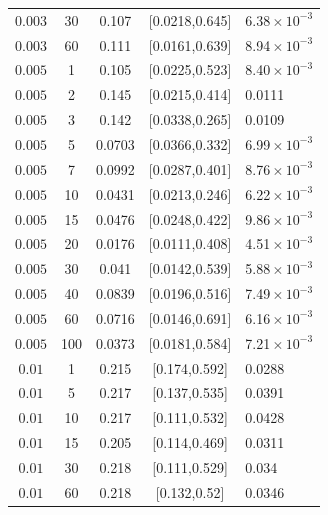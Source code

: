 \documentclass[11pt]{article}
\numberwithin{equation}{section}
\begin{document}
\begin{longtable}{ccccl}
$0.003$ & 30 & 0.107 & [0.0218,0.645] & 6.38$\!\times\!10^{-3}$ \\
$0.003$ & 60 & 0.111 & [0.0161,0.639] & 8.94$\!\times\!10^{-3}$ \\
$0.005$ & 1 & 0.105 & [0.0225,0.523] & 8.40$\!\times\!10^{-3}$ \\
$0.005$ & 2 & 0.145 & [0.0215,0.414] & 0.0111 \\
$0.005$ & 3 & 0.142 & [0.0338,0.265] & 0.0109 \\
$0.005$ & 5 & 0.0703 & [0.0366,0.332] & 6.99$\!\times\!10^{-3}$ \\
$0.005$ & 7 & 0.0992 & [0.0287,0.401] & 8.76$\!\times\!10^{-3}$ \\
$0.005$ & 10 & 0.0431 & [0.0213,0.246] & 6.22$\!\times\!10^{-3}$ \\
$0.005$ & 15 & 0.0476 & [0.0248,0.422] & 9.86$\!\times\!10^{-3}$ \\
$0.005$ & 20 & 0.0176 & [0.0111,0.408] & 4.51$\!\times\!10^{-3}$ \\
$0.005$ & 30 & 0.041 & [0.0142,0.539] & 5.88$\!\times\!10^{-3}$ \\
$0.005$ & 40 & 0.0839 & [0.0196,0.516] & 7.49$\!\times\!10^{-3}$ \\
$0.005$ & 60 & 0.0716 & [0.0146,0.691] & 6.16$\!\times\!10^{-3}$ \\
$0.005$ & 100 & 0.0373 & [0.0181,0.584] & 7.21$\!\times\!10^{-3}$ \\
$0.01$ & 1 & 0.215 & [0.174,0.592] & 0.0288 \\
$0.01$ & 5 & 0.217 & [0.137,0.535] & 0.0391 \\
$0.01$ & 10 & 0.217 & [0.111,0.532] & 0.0428 \\
$0.01$ & 15 & 0.205 & [0.114,0.469] & 0.0311 \\
$0.01$ & 30 & 0.218 & [0.111,0.529] & 0.034 \\
$0.01$ & 60 & 0.218 & [0.132,0.52] & 0.0346\\\bottomrule
\end{longtable}
\end{document}
